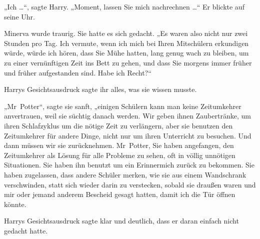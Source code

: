 „Ich …“, sagte Harry. „Moment, lassen Sie mich nachrechnen …“ Er blickte auf seine Uhr.

Minerva wurde traurig. Sie hatte es sich gedacht. „Es waren also nicht nur zwei Stunden pro Tag. Ich vermute, wenn ich mich bei Ihren Mitschülern erkundigen würde, würde ich hören, dass Sie Mühe hatten, lang genug wach zu bleiben, um zu einer vernünftigen Zeit ins Bett zu gehen, und dass Sie morgens immer früher und früher aufgestanden sind. Habe ich Recht?“

Harrys Gesichtsausdruck sagte ihr alles, was sie wissen musste.

„Mr~Potter“, sagte sie sanft, „einigen Schülern kann man keine Zeitumkehrer anvertrauen, weil sie süchtig danach werden. Wir geben ihnen Zaubertränke, um ihren Schlafzyklus um die nötige Zeit zu verlängern, aber sie benutzen den Zeitumkehrer für andere Dinge, nicht nur um ihren Unterricht zu besuchen. Und dann müssen wir sie zurücknehmen. Mr~Potter, Sie haben angefangen, den Zeitumkehrer als Lösung für alle Probleme zu sehen, oft in völlig unnötigen Situationen. Sie haben ihn benutzt um ein Erinnermich zurück zu bekommen. Sie haben zugelassen, dass andere Schüler merken, wie sie aus einem Wandschrank verschwinden, statt sich wieder darin zu verstecken, sobald sie draußen waren und mir oder jemand anderem Bescheid gesagt hatten, damit ich die Tür öffnen könnte.

Harrys Gesichtsausdruck sagte klar und deutlich, dass er daran einfach nicht gedacht hatte.

